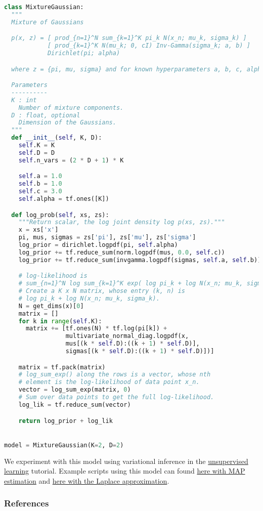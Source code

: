 \begin{lstlisting}[language=Python]
class MixtureGaussian:
  """
  Mixture of Gaussians

  p(x, z) = [ prod_{n=1}^N sum_{k=1}^K pi_k N(x_n; mu_k, sigma_k) ]
            [ prod_{k=1}^K N(mu_k; 0, cI) Inv-Gamma(sigma_k; a, b) ]
            Dirichlet(pi; alpha)

  where z = {pi, mu, sigma} and for known hyperparameters a, b, c, alpha.

  Parameters
  ----------
  K : int
    Number of mixture components.
  D : float, optional
    Dimension of the Gaussians.
  """
  def __init__(self, K, D):
    self.K = K
    self.D = D
    self.n_vars = (2 * D + 1) * K

    self.a = 1.0
    self.b = 1.0
    self.c = 3.0
    self.alpha = tf.ones([K])

  def log_prob(self, xs, zs):
    """Return scalar, the log joint density log p(xs, zs)."""
    x = xs['x']
    pi, mus, sigmas = zs['pi'], zs['mu'], zs['sigma']
    log_prior = dirichlet.logpdf(pi, self.alpha)
    log_prior += tf.reduce_sum(norm.logpdf(mus, 0.0, self.c))
    log_prior += tf.reduce_sum(invgamma.logpdf(sigmas, self.a, self.b))

    # log-likelihood is
    # sum_{n=1}^N log sum_{k=1}^K exp( log pi_k + log N(x_n; mu_k, sigma_k) )
    # Create a K x N matrix, whose entry (k, n) is
    # log pi_k + log N(x_n; mu_k, sigma_k).
    N = get_dims(x)[0]
    matrix = []
    for k in range(self.K):
      matrix += [tf.ones(N) * tf.log(pi[k]) +
                 multivariate_normal_diag.logpdf(x,
                 mus[(k * self.D):((k + 1) * self.D)],
                 sigmas[(k * self.D):((k + 1) * self.D)])]

    matrix = tf.pack(matrix)
    # log_sum_exp() along the rows is a vector, whose nth
    # element is the log-likelihood of data point x_n.
    vector = log_sum_exp(matrix, 0)
    # Sum over data points to get the full log-likelihood.
    log_lik = tf.reduce_sum(vector)

    return log_prior + log_lik


model = MixtureGaussian(K=2, D=2)
\end{lstlisting}

We experiment with this model using variational inference in the
\href{unsupervised}{unsupervised learning} tutorial.
Example scripts using this model can found
\href{https://github.com/blei-lab/edward/blob/master/examples/tf_mixture_gaussian_map.py}
{here with MAP estimation} and
\href{https://github.com/blei-lab/edward/blob/master/examples/tf_mixture_gaussian_laplace.py}
{here with the Laplace approximation}.

\subsubsection{References}\label{references}

